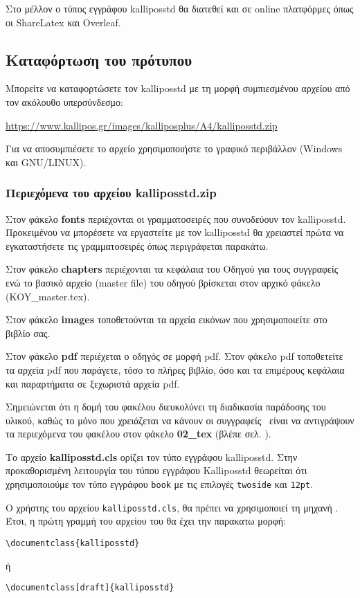 \begin{refsection}
Στο μέλλον ο τύπος εγγράφου kalliposstd θα διατεθεί και σε online πλατφόρμες όπως οι ShareLatex και Overleaf.

\subsection{Καταφόρτωση του πρότυπου}
Μπορείτε να καταφορτώσετε τον kalliposstd με τη μορφή συμπιεσμένου αρχείου από τον ακόλουθο υπερσύνδεσμο:

\url{https://www.kallipos.gr/images/kalliposplus/A4/kalliposstd.zip}

Για να αποσυμπιέσετε το αρχείο χρησιμοποιήστε το γραφικό περιβάλλον (Windows και GNU/LINUX).

\subsubsection{Περιεχόμενα του αρχείου kalliposstd.zip}
Στον φάκελο \textbf{fonts} περιέχονται οι γραμματοσειρές που συνοδεύουν τον kalliposstd. Προκειμένου να μπορέσετε να εργαστείτε με τον kalliposstd θα χρειαστεί πρώτα να εγκαταστήσετε τις γραμματοσειρές όπως περιγράφεται παρακάτω.

Στον φάκελο \textbf{chapters} περιέχονται τα κεφάλαια του Οδηγού για τους συγγραφείς \XeLaTeX\, ενώ το βασικό αρχείο (master file) του οδηγού βρίσκεται στον αρχικό φάκελο (KOY\_master.tex).

Στον φάκελο \textbf{images} τοποθετούνται τα αρχεία εικόνων που χρησιμοποιείτε στο βιβλίο σας.

Στον φάκελο \textbf{pdf} περιέχεται ο οδηγός σε μορφή pdf. Στον φάκελο pdf τοποθετείτε τα αρχεία pdf που παράγετε, τόσο το πλήρες βιβλίο, όσο και τα επιμέρους κεφάλαια και παραρτήματα σε ξεχωριστά αρχεία pdf.

Σημειώνεται ότι η δομή του φακέλου διευκολύνει τη διαδικασία παράδοσης του υλικού, καθώς το μόνο που χρειάζεται να κάνουν οι συγγραφείς  \XeLaTeX\ είναι να αντιγράψουν τα περιεχόμενα του φακέλου στον φάκελο \textbf{02\_tex} (βλέπε σελ. \pageref{package}).

Tο αρχείο \textbf{kalliposstd.cls} ορίζει τον τύπο εγγράφου kalliposstd. Στην
προκαθορισμένη λειτουργία του τύπου εγγράφου Kalliposstd θεωρείται ότι χρησιμοποιούμε τον τύπο
εγγράφου \texttt{book} με τις επιλογές \texttt{twoside} και \texttt{12pt}.

O χρήστης του αρχείου \texttt{kalliposstd.cls}, θα πρέπει να χρησιμοποιεί τη μηχανή \XeLaTeX.
Έτσι, η πρώτη γραμμή του αρχείου του θα έχει την παρακατω μορφή:
\begin{center}
\verb=\documentclass{kalliposstd}=
\end{center}
ή
\begin{center}
\verb=\documentclass[draft]{kalliposstd}=
\end{center}


\end{refsection}
